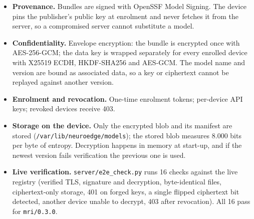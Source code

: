 \documentclass[11pt,a4paper]{article}
\begin{document}
\begin{itemize}
\item \textbf{Provenance.} Bundles are signed with OpenSSF Model Signing. The device pins the publisher's public key at
enrolment and never fetches it from the server, so a compromised server cannot substitute a model.
\item \textbf{Confidentiality.} Envelope encryption: the bundle is encrypted once with AES-256-GCM; the data key is
wrapped separately for every enrolled device with X25519 ECDH, HKDF-SHA256 and AES-GCM. The model name and version are
bound as associated data, so a key or ciphertext cannot be replayed against another version.
\item \textbf{Enrolment and revocation.} One-time enrolment tokens; per-device API keys; revoked devices receive 403.
\item \textbf{Storage on the device.} Only the encrypted blob and its manifest are stored
(\texttt{/var/lib/neuroedge/models}); the stored blob measures 8.000 bits per byte of entropy. Decryption happens in
memory at start-up, and if the newest version fails verification the previous one is used.
\item \textbf{Live verification.} \texttt{server/e2e\_check.py} runs 16 checks against the live registry (verified TLS,
signature and decryption, byte-identical files, ciphertext-only storage, 401 on forged keys, a single flipped
ciphertext bit detected, another device unable to decrypt, 403 after revocation). All 16 pass for \texttt{mri/0.3.0}.
\end{itemize}

\end{document}
